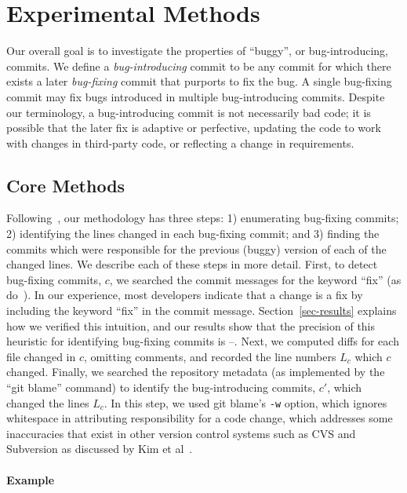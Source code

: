 \section{Experimental Methods}
\label{sec:method}

Our overall goal is to investigate the properties of ``buggy'', or
bug-introducing, commits. We define a \emph{bug-introducing} commit to be any
commit for which there exists a later \emph{bug-fixing} commit that purports to
fix the bug. A single bug-fixing commit may fix bugs introduced in multiple
bug-introducing commits. Despite our terminology, a bug-introducing commit is
not necessarily bad code; it is possible that the later fix is adaptive or
perfective, updating the code to work with changes in third-party code, or
reflecting a change in requirements.

\subsection{Core Methods}

Following~\cite{sliwerski-msr-2005}, our methodology has three steps: 1)
enumerating bug-fixing commits; 2) identifying the lines changed in each
bug-fixing commit; and 3) finding the commits which were responsible for the
previous (buggy) version of each of the changed lines. We describe each of these
steps in more detail. First, to detect bug-fixing commits, $c$, we searched the
commit messages for the keyword ``fix'' (as do~\cite{smallCommits05}).  In our
experience, most developers indicate that a change is a fix by including the
keyword ``fix'' in the commit message. Section~\ref{sec-results} explains how we
verified this intuition, and our results show that the precision of this
heuristic for identifying bug-fixing commits is \postP--\linuxP.  Next, we
computed diffs for each file changed in $c$, omitting comments, and recorded the
line numbers $L_c$ which $c$ changed. Finally, we searched the repository
metadata (as implemented by the ``git blame'' command) to identify the
bug-introducing commits, $c'$, which changed the lines $L_c$. In this step, we
used git blame's {\tt -w} option, which ignores whitespace in attributing
responsibility for a code change, which addresses some inaccuracies that exist
in other version control systems such as CVS and Subversion as discussed by Kim
et al~\cite{2006-automatic}.

\paragraph{Example}

